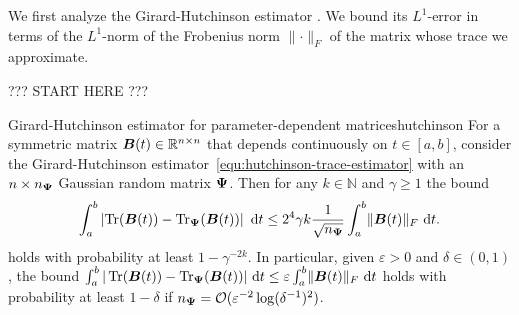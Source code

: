 We first analyze the Girard-Hutchinson estimator . We bound its $L^1$-error in terms of the $L^1$-norm of the Frobenius norm $\lVert \cdot \rVert _F$ of the matrix whose trace we approximate.

??? START HERE ???
\color{blue}
\begin{theorem}{Girard-Hutchinson estimator for parameter-dependent matrices}{hutchinson}
    For a symmetric matrix $\boldsymbol{B}(t) \in \mathbb{R}^{n \times n}$ that depends continuously on $t \in [a, b]$, consider the  Girard-Hutchinson estimator~\eqref{equ:hutchinson-trace-estimator} with an $n\times n_{\boldsymbol{\Psi}}$ Gaussian random matrix $\boldsymbol{\Psi}$. Then for any $k \in \mathbb{N}$ and $\gamma \geq 1$ the bound 
    \begin{equation} \label{eq:ghbound}
        \int_{a}^{b} \left| \operatorname{Tr}(\boldsymbol{B}(t)) - \operatorname{Tr}_{\boldsymbol{\Psi}}(\boldsymbol{B}(t)) \right| ~\mathrm{d}t \leq 2^4 \gamma k \frac{1}{\sqrt{n_{\boldsymbol{\Psi}}}} \int_{a}^{b} \lVert \boldsymbol{B}(t) \rVert _F  ~\mathrm{d}t.
    \end{equation}
    holds with probability at least $1 - \gamma^{-2k}$.
    In particular, given $\varepsilon > 0$ and $\delta \in (0, 1)$, the bound $\int_{a}^{b} | \operatorname{Tr}(\boldsymbol{B}(t)) - \operatorname{Tr}_{\boldsymbol{\Psi}}(\boldsymbol{B}(t)) | ~\mathrm{d}t \leq \varepsilon \int_{a}^{b} \lVert \boldsymbol{B}(t) \rVert _F~\mathrm{d}t$ holds 
    with probability at least $1-\delta$ if $n_{\boldsymbol{\Psi}} = \mathcal{O}(\varepsilon^{-2} \log(\delta^{-1})^2)$.
\end{theorem}

